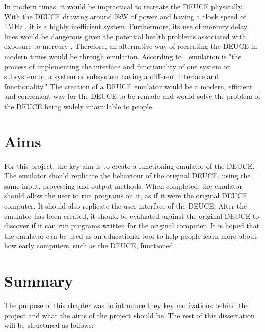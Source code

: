 \documentclass{l4proj}
\begin{document}
In modern times, it would be impractical to recreate the DEUCE physically. With the DEUCE drawing around 9kW of power and having a clock speed of 1MHz \citep{Glasgow60}, it is a highly inefficient system. Furthermore, its use of mercury delay lines would be dangerous given the potential health problems associated with exposure to mercury \citep{Gao17}. Therefore, an alternative way of recreating the DEUCE in modern times would be through emulation. According to \citet{Nair05}, emulation is "the process of implementing the interface and functionality of one system or subsystem on a system or subsystem having a different interface and functionality." The creation of a DEUCE emulator would be a modern, efficient and convenient way for the DEUCE to be remade and would solve the problem of the DEUCE being widely unavailable to people.

\section{Aims}

For this project, the key aim is to create a functioning emulator of the DEUCE. The emulator should replicate the behaviour of the original DEUCE, using the same input, processing and output methods. When completed, the emulator should allow the user to run programs on it, as if it were the original DEUCE computer. It should also replicate the user interface of the DEUCE. After the emulator has been created, it should be evaluated against the original DEUCE to discover if it can run programs written for the original computer. It is hoped that the emulator can be used as an educational tool to help people learn more about how early computers, such as the DEUCE, functioned.

\section{Summary}

The purpose of this chapter was to introduce they key motivations behind the project and what the aims of the project should be. The rest of this dissertation will be structured as follows:
\end{document}

